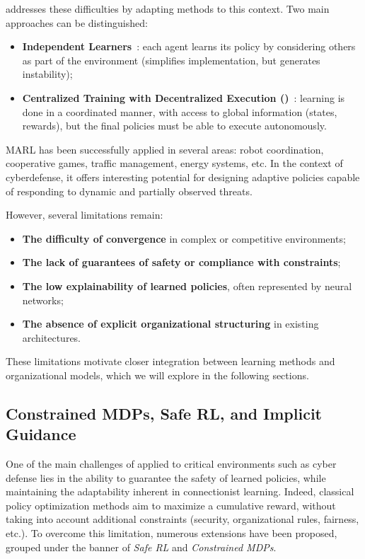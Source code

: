          addresses these difficulties by adapting  methods to this context. Two main approaches can be distinguished:
        \begin {itemize}
  \item \textbf{Independent Learners}~: each agent learns its policy by considering others as part of the environment (simplifies implementation, but generates instability);
  \item \textbf{Centralized Training with Decentralized Execution ()}~: learning is done in a coordinated manner, with access to global information (states, rewards), but the final policies must be able to execute autonomously.
        \end {itemize}


        MARL has been successfully applied in several areas: robot coordination, cooperative games, traffic management, energy systems, etc. In the context of cyberdefense, it offers interesting potential for designing adaptive policies capable of responding to dynamic and partially observed threats.

        However, several limitations remain:
        \begin{itemize}
          \item \textbf{The difficulty of convergence} in complex or competitive environments;
          \item \textbf{The lack of guarantees of safety or compliance with constraints};
          \item \textbf{The low explainability of learned policies}, often represented by neural networks;
          \item \textbf{The absence of explicit organizational structuring} in existing architectures.
        \end{itemize}

        These limitations motivate closer integration between learning methods and organizational models, which we will explore in the following sections.



        \subsection{Constrained MDPs, Safe RL, and Implicit Guidance}

        \noindent
        One of the main challenges of  applied to critical environments
        such as cyber defense lies in the ability to guarantee the safety of learned policies,
        while maintaining the adaptability inherent in connectionist learning.
        Indeed, classical policy optimization methods aim to maximize a cumulative reward,
        without taking into account additional constraints (security, organizational rules, fairness, etc.).
        To overcome this limitation, numerous extensions have been proposed, grouped under the banner
        of \textit{Safe RL} and \textit{Constrained MDPs}.

